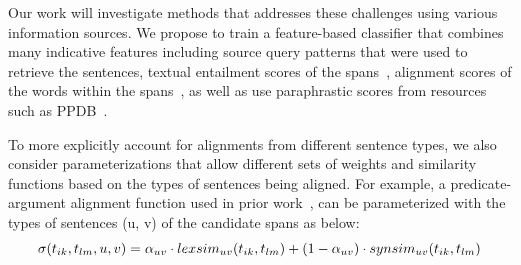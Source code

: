 
Our work will investigate methods that addresses these challenges using various information sources.
We propose to train a feature-based classifier that combines many indicative features including source query patterns that were used to retrieve the sentences,
textual entailment scores of the spans~\cite{stern2012biutee}, alignment scores of the words within the spans~\cite{yao2013lightweight}, 
as well as use paraphrastic scores from resources such as PPDB~\cite{PavlickEtAl-2015:ACL:Semantics}.

To more explicitly account for alignments from different sentence types, we also consider parameterizations that allow different sets of weights 
and similarity functions based on the types of sentences being aligned. 
For example, a predicate-argument alignment function used in prior work~\cite{furstenau-emnlp2009,furstenau2012semi,lang-naacl2010}, 
can be parameterized with the types of sentences (u, v) of the candidate spans as below:
\begin{align*}
\sigma(t_{ik}, t_{lm}, u, v)	= \alpha_{uv} \cdot lexsim_{uv}(t_{ik}, t_{lm}) + (1 - \alpha_{uv}) \cdot synsim_{uv}(t_{ik}, t_{lm})\\
\vspace{-2em}
\end{align*}







